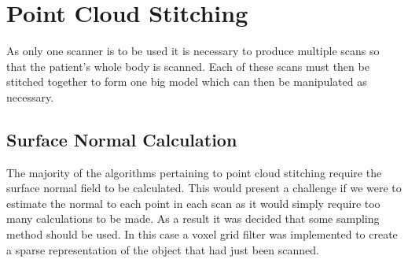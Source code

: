 \section{Point Cloud Stitching}
As only one scanner is to be used it is necessary to produce multiple scans so that the patient's whole body is scanned. Each of these scans must then be stitched together to form one big model which can then be manipulated as necessary. 

\subsection{Surface Normal Calculation}
The majority of the algorithms pertaining to point cloud stitching require the surface normal field to be calculated. This would present a challenge if we were to estimate the normal to each point in each scan as it would simply require too many calculations to be made. As a result it was decided that some sampling method should be used. In this case a voxel grid filter was implemented to create a sparse representation of the object that had just been scanned.  